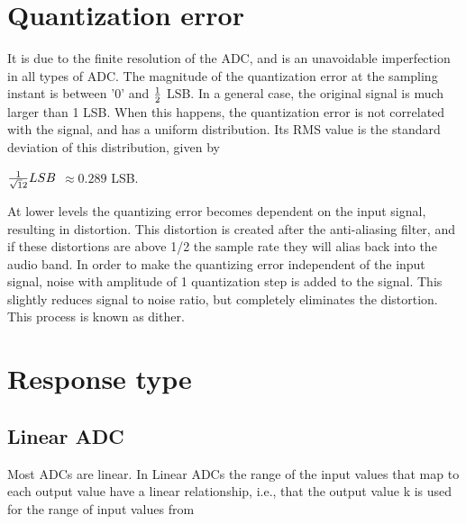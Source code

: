 \section{Quantization error}

\par
\hspace{1.2cm} It is due to the finite resolution of the ADC, and is an unavoidable imperfection in all types of ADC. The magnitude of the quantization error at the sampling instant is between '0' and $1 \over 2$ LSB. In a general case, the original signal is much larger than 1 LSB. When this happens, the quantization error is not correlated with the signal, and has a uniform distribution. Its RMS value is the standard deviation of this distribution, given by

\begin{center}
${1 \over {\sqrt 12}} LSB$ $\approx 0.289$ LSB. 
\end{center}








\par
\hspace{0.5cm} At lower levels the quantizing error becomes dependent on the input signal, resulting in distortion. This distortion is created after the anti-aliasing filter, and if these distortions are above 1/2 the sample rate they will alias back into the audio band. In order to make the quantizing error independent of the input signal, noise with amplitude of 1 quantization step is added to the signal. This slightly reduces signal to noise ratio, but completely eliminates the distortion. This process is known as dither.\\


\section{Response type}

\subsection{Linear ADC}

\par
\hspace{1.2cm} Most ADCs are linear. In Linear ADCs the range of the input values that map to each output value have a linear relationship, i.e., that the output value k is used for the range of input values from

